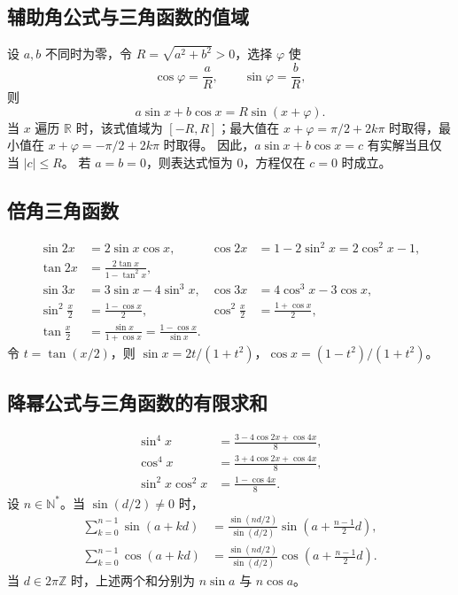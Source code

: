 \documentclass[../main.tex]{subfiles}
\begin{document}
\subsection{辅助角公式与三角函数的值域}
设 $a,b$ 不同时为零，令 $R=\sqrt{a^2+b^2}>0$，选择 $\varphi$ 使
\[
\cos\varphi=\frac aR,\qquad \sin\varphi=\frac bR,
\]
则
\[
a\sin x+b\cos x=R\sin(x+\varphi).
\]
当 $x$ 遍历 $\mathbb R$ 时，该式值域为 $[-R,R]$；最大值在 $x+\varphi=\pi/2+2k\pi$ 时取得，最小值在 $x+\varphi=-\pi/2+2k\pi$ 时取得。
因此，$a\sin x+b\cos x=c$ 有实解当且仅当 $|c|\le R$。
若 $a=b=0$，则表达式恒为 $0$，方程仅在 $c=0$ 时成立。
\subsection{倍角三角函数}
\begin{align*}
\sin2x&=2\sin x\cos x, & \cos2x&=1-2\sin^2x=2\cos^2x-1,\\
\tan2x&=\frac{2\tan x}{1-\tan^2x},\\
\sin3x&=3\sin x-4\sin^3x, & \cos3x&=4\cos^3x-3\cos x,\\
\sin^2\frac x2&=\frac{1-\cos x}2, & \cos^2\frac x2&=\frac{1+\cos x}2,\\
\tan\frac x2&=\frac{\sin x}{1+\cos x}=\frac{1-\cos x}{\sin x}.
\end{align*}
令 $t=\tan(x/2)$，则 $\sin x=2t/(1+t^2)$，$\cos x=(1-t^2)/(1+t^2)$。
\subsection{降幂公式与三角函数的有限求和}
\begin{align*}
\sin^4x&=\frac{3-4\cos2x+\cos4x}{8},\\
\cos^4x&=\frac{3+4\cos2x+\cos4x}{8},\\
\sin^2x\cos^2x&=\frac{1-\cos4x}{8}.
\end{align*}
设 $n\in\mathbb N^*$。当 $\sin(d/2)\ne0$ 时，
\begin{align*}
\sum_{k=0}^{n-1}\sin(a+kd)
&=\frac{\sin(nd/2)}{\sin(d/2)}\sin\left(a+\frac{n-1}{2}d\right),\\
\sum_{k=0}^{n-1}\cos(a+kd)
&=\frac{\sin(nd/2)}{\sin(d/2)}\cos\left(a+\frac{n-1}{2}d\right).
\end{align*}
当 $d\in2\pi\mathbb Z$ 时，上述两个和分别为 $n\sin a$ 与 $n\cos a$。
\end{document}

